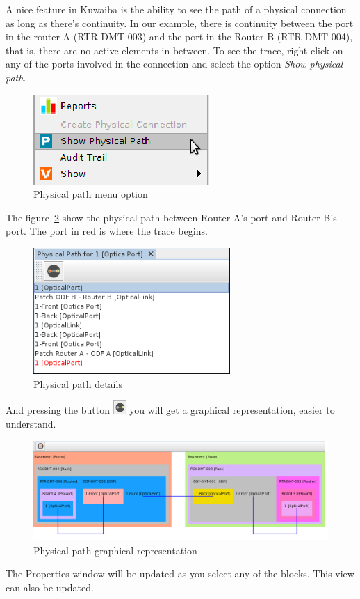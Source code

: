 \documentclass[a4paper]{article}
\begin{document}
			A nice feature in Kuwaiba is the ability to see the path of a physical connection as long as there's continuity. In our example, there is continuity between the port in the router A (RTR-DMT-003) and the port in the Router B (RTR-DMT-004), that is, there are no active elements in between. To see the trace, right-click on any of the ports involved in the connection and select the option \textit{Show physical path}.
			\begin{figure}[h!]
				\centering
				\includegraphics[width=0.3\linewidth]{img/l1_example_2_physical_path_menu.png}
				\caption{Physical path menu option}
				\label{fig:l1_example_2_physical_path_menu}
			\end{figure}
			The figure~\ref{fig:l1_example_2_physical_path_list} show the physical path between Router A's port and Router B's port. The port in red is where the trace begins.
			\begin{figure}[h!]
				\centering
				\includegraphics[width=0.4\linewidth]{img/l1_example_2_physical_path_list.png}
				\caption{Physical path details}
				\label{fig:l1_example_2_physical_path_list}
			\end{figure}
			
			And pressing the button \includegraphics[width=0.5cm]{img/icon_physical_path_graphical.png} you will get a graphical representation, easier to understand.
			\begin{figure}[h!]
				\centering
				\includegraphics[width=1.1\linewidth]{img/l1_example_2_physical_path_view.png}
				\caption{Physical path graphical representation}
				\label{fig:l1_example_2_physical_path_view}
			\end{figure}
			The Properties window will be updated as you select any of the blocks. This view can also be updated.
			
\end{document}
